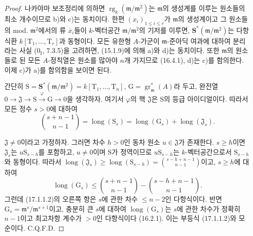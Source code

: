 \begin{proof}
나카야마 보조정리에 의하면
$\operatorname{rg}_k(\mathfrak{m}/\mathfrak{m}^2)$는
$\mathfrak{m}$의 생성계를 이루는 원소들의 최소 개수이므로 b)와 c)는
동치이다. 한편 $(x_i)_{1\leq i\leq r}$가 $\mathfrak{m}$의 생성계이고
그 원소들의 mod. $\mathfrak{m}^2$에서의 류 $\overline{x}_i$들이
$k$-벡터공간 $\mathfrak{m}/\mathfrak{m}^2$의 기저를 이루면,
$\mathbf{S}^*(\mathfrak{m}/\mathfrak{m}^2)$는 다항식환
$k[\mathrm{T}_1,\ldots,\mathrm{T}_r]$과 동형이다. 모든 유한형
$A$-가군이 $\mathfrak{m}$-준아딕 여과에 대하여 분리라는 사실
($0_{\mathrm I}$, 7.3.5)을 고려하면, (15.1.9)에 의해 a)와 d)는
동치이다. 또한 $\mathfrak{m}$의 원소들로 된 모든 $A$-정칙열은
원소를 많아야 $n$개 가지므로 (16.4.1), d)는 c)를 함의한다.
이제 c)가 a)를 함의함을 보이면 된다.

간단히
$\mathrm{S}=\mathbf{S}^*(\mathfrak{m}/\mathfrak{m}^2)
=k[\mathrm{T}_1,\ldots,\mathrm{T}_n]$,
$\mathrm{G}=\operatorname{gr}^*_{\mathfrak{m}}(A)$라 두고, 완전열
$0\longrightarrow\mathfrak{J}\longrightarrow\mathrm{S}
\xrightarrow{\varphi}\mathrm{G}\longrightarrow0$을 생각하자. 여기서
$\varphi$의 핵 $\mathfrak{J}$은 $\mathrm{S}$의 등급 아이디얼이다.
따라서 모든 정수 $s>0$에 대하여
\begin{equation}
\label{0.17.1.1.1-fr}
\tag{17.1.1.1}
  \binom{s+n-1}{n-1}
  =\operatorname{long}(\mathrm{S}_s)
  =\operatorname{long}(\mathrm{G}_s)
  +\operatorname{long}(\mathfrak{J}_s).
\end{equation}

$\mathfrak{J}\neq0$이라고 가정하자. 그러면 차수 $h>0$인 동차 원소
$u\in\mathfrak{J}$가 존재한다. $s\geq h$이면 $\mathfrak{J}_s$는
$u\mathrm{S}_{s-h}$를 포함하고, $u\neq0$이며 $\mathrm{S}$가
정역이므로 $u\mathrm{S}_{s-h}$는 $k$-벡터공간으로서
$\mathrm{S}_{s-h}$와 동형이다. 따라서
$\operatorname{long}(\mathfrak{J}_s)\geq
\operatorname{long}(\mathrm{S}_{s-h})=\binom{s-h+n-1}{n-1}$이고,
$s\geq h$에 대하여
\begin{equation}
\label{0.17.1.1.2-fr}
\tag{17.1.1.2}
  \operatorname{long}(\mathrm{G}_s)
  \leq\binom{s+n-1}{n-1}-\binom{s-h+n-1}{n-1}.
\end{equation}
그런데 (17.1.1.2)의 오른쪽 항은 $s$에 관한 차수 $\leq n-2$인
다항식이다. 반면 $\mathrm{G}_s=\mathfrak{m}^s/\mathfrak{m}^{s+1}$이고,
충분히 큰 $s$에 대하여 $\operatorname{long}(\mathrm{G}_s)$는 $s$에
관한 차수가 정확히 $n-1$이고 최고차항 계수가 $>0$인 다항식이다
(16.2.1). 이는 부등식 (17.1.1.2)와 모순이다. C.Q.F.D.
\end{proof}


